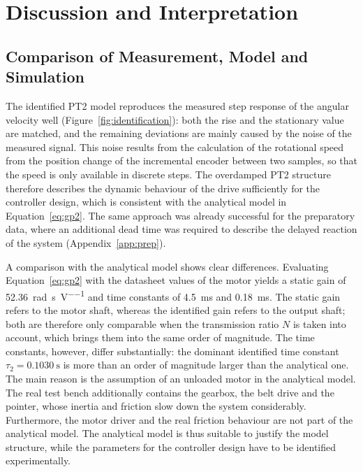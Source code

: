 \chapter{Discussion and Interpretation}\label{ch:discussion}

\section{Comparison of Measurement, Model and Simulation}\label{sec:comparison}
The identified PT2 model reproduces the measured step response of the angular
velocity well (Figure~\ref{fig:identification}): both the rise and the
stationary value are matched, and the remaining deviations are mainly caused by
the noise of the measured signal. This noise results from the calculation of the
rotational speed from the position change of the incremental encoder between
two samples\autocite{laboranleitung}, so that the speed is only available in
discrete steps. The overdamped PT2 structure therefore describes the dynamic
behaviour of the drive sufficiently for the controller design, which is
consistent with the analytical model in Equation~\eqref{eq:gp2}. The same
approach was already successful for the preparatory data, where an additional
dead time was required to describe the delayed reaction of the system
(Appendix~\ref{app:prep}).

A comparison with the analytical model shows clear differences. Evaluating
Equation~\eqref{eq:gp2} with the datasheet values of the motor\autocite{faulhaber3257}
yields a static gain of \qty{52.36}{\radian\per\second\per\volt} and time
constants of \qty{4.5}{\milli\second} and \qty{0.18}{\milli\second}. The static
gain refers to the motor shaft, whereas the identified gain refers to the output
shaft; both are therefore only comparable when the transmission ratio $N$ is
taken into account, which brings them into the same order of magnitude. The time
constants, however, differ substantially: the dominant identified time constant
$\tau_2 = \qty{0.1030}{\second}$ is more than an order of magnitude larger than
the analytical one. The main reason is the assumption of an unloaded motor in the
analytical model. The real test bench additionally contains the gearbox, the
belt drive and the pointer, whose inertia and friction slow down the system
considerably. Furthermore, the motor driver and the real friction behaviour are
not part of the analytical model. The analytical model is thus suitable to
justify the model structure, while the parameters for the controller design have
to be identified experimentally.

